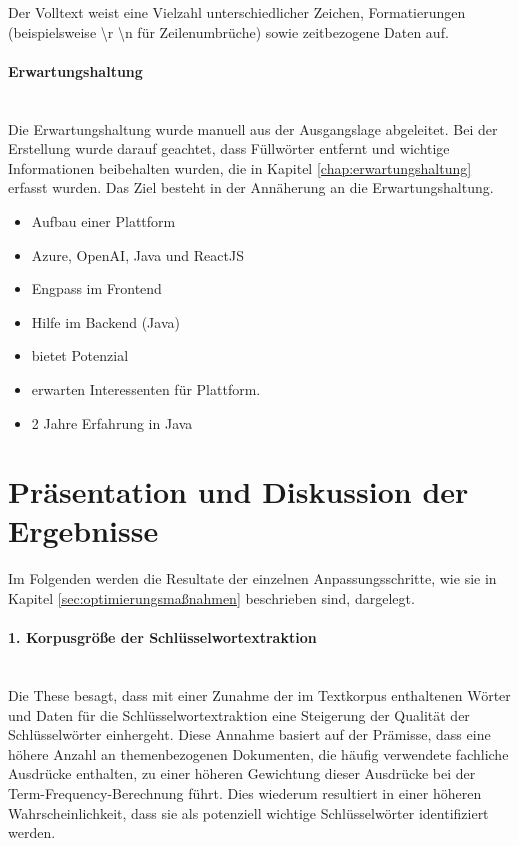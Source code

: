 Der Volltext weist eine Vielzahl unterschiedlicher Zeichen, Formatierungen (beispielsweise \textbackslash r \textbackslash n für Zeilenumbrüche) sowie zeitbezogene Daten auf.
\paragraph{Erwartungshaltung}\mbox{}\\
Die Erwartungshaltung wurde manuell aus der Ausgangslage abgeleitet. Bei der Erstellung wurde darauf geachtet, dass Füllwörter entfernt und wichtige Informationen beibehalten wurden, die in Kapitel \ref{chap:erwartungshaltung} erfasst wurden. Das Ziel besteht in der Annäherung an die Erwartungshaltung.
\begin{itemize}
	\itemsep-0.5em
	\item Aufbau einer Plattform
	\item Azure, OpenAI, Java und ReactJS
	\item Engpass im Frontend
	\item Hilfe im Backend (Java)
	\item bietet Potenzial
	\item erwarten Interessenten für Plattform.
	\item 2 Jahre Erfahrung in Java
\end{itemize}
\section{Präsentation und Diskussion der Ergebnisse}
Im Folgenden werden die Resultate der einzelnen Anpassungsschritte, wie sie in Kapitel \ref{sec:optimierungsmaßnahmen} beschrieben sind, dargelegt.
\paragraph{1. Korpusgröße der Schlüsselwortextraktion}\mbox{}\\
Die These besagt, dass mit einer Zunahme der im Textkorpus enthaltenen Wörter und Daten für die Schlüsselwortextraktion eine Steigerung der Qualität der Schlüsselwörter einhergeht. Diese Annahme basiert auf der Prämisse, dass eine höhere Anzahl an themenbezogenen Dokumenten, die häufig verwendete fachliche Ausdrücke enthalten, zu einer höheren Gewichtung dieser Ausdrücke bei der Term-Frequency-Berechnung führt. Dies wiederum resultiert in einer höheren Wahrscheinlichkeit, dass sie als potenziell wichtige Schlüsselwörter identifiziert werden.\\


